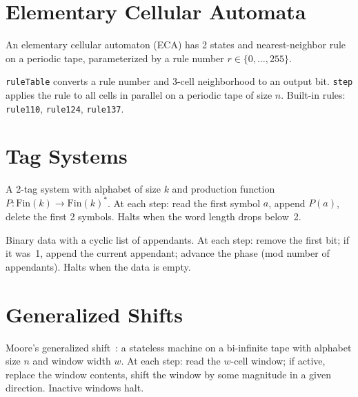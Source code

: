 \section{Elementary Cellular Automata}

An elementary cellular automaton (ECA) has 2 states and nearest-neighbor rule on
a periodic tape, parameterized by a rule number $r \in \{0,\ldots,255\}$.

\begin{definition}[ECA]\label{eca-def}
\leanok
{}
\texttt{ruleTable} converts a rule number and 3-cell neighborhood to an output
bit. \texttt{step} applies the rule to all cells in parallel on a periodic tape
of size $n$. Built-in rules: \texttt{rule110}, \texttt{rule124}, \texttt{rule137}.
\end{definition}

\section{Tag Systems}

\begin{definition}\label{tag-def}
\leanok
{}
A 2-tag system with alphabet of size $k$ and production function
$P : \mathrm{Fin}(k) \to \mathrm{Fin}(k)^*$. At each step:
read the first symbol $a$, append $P(a)$, delete the first 2 symbols.
Halts when the word length drops below~2.
\end{definition}

\begin{definition}\label{cts-def}
\leanok
{}
Binary data with a cyclic list of appendants. At each step: remove the first
bit; if it was~1, append the current appendant; advance the phase (mod number
of appendants). Halts when the data is empty.
\end{definition}

\section{Generalized Shifts}

\begin{definition}\label{gs-def}
\leanok
{}
Moore's generalized shift~\cite{moore1991generalized}: a stateless machine on a
bi-infinite tape with alphabet size $n$ and window width $w$. At each step:
read the $w$-cell window; if active, replace the window contents, shift the
window by some magnitude in a given direction. Inactive windows halt.
\end{definition}

